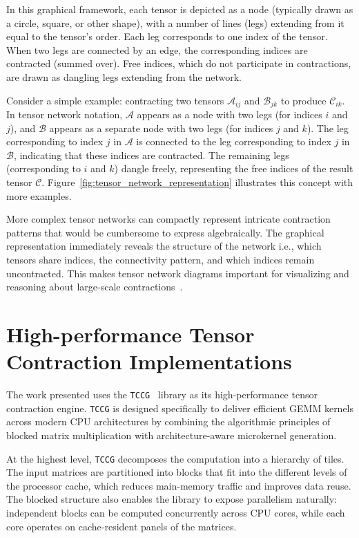 In this graphical framework, each tensor is depicted as a node (typically drawn as a circle, square, or other shape), with a number of lines (legs) extending from it equal to the tensor's order. Each leg corresponds to one index of the tensor. When two legs are connected by an edge, the corresponding indices are contracted (summed over). Free indices, which do not participate in contractions, are drawn as dangling legs extending from the network.

Consider a simple example: contracting two tensors $\mathcal{A}_{ij}$ and $\mathcal{B}_{jk}$ to produce $\mathcal{C}_{ik}$. In tensor network notation, $\mathcal{A}$ appears as a node with two legs (for indices $i$ and $j$), and $\mathcal{B}$ appears as a separate node with two legs (for indices $j$ and $k$). The leg corresponding to index $j$ in $\mathcal{A}$ is connected to the leg corresponding to index $j$ in $\mathcal{B}$, indicating that these indices are contracted. The remaining legs (corresponding to $i$ and $k$) dangle freely, representing the free indices of the result tensor $\mathcal{C}$. Figure~\ref{fig:tensor_network_representation} illustrates this concept with more examples.

More complex tensor networks can compactly represent intricate contraction patterns that would be cumbersome to express algebraically. The graphical representation immediately reveals the structure of the network i.e., which tensors share indices, the connectivity pattern, and which indices remain uncontracted. This makes tensor network diagrams important for visualizing and reasoning about large-scale contractions~\cite{biamonte2017tensor}. 

\section{High-performance Tensor Contraction Implementations}

The work presented uses the \texttt{\ac{TCCG}}~\cite{tccg2016a} library as its high-performance tensor contraction engine. \texttt{\ac{TCCG}} is designed specifically to deliver efficient \ac{GEMM} kernels across modern CPU architectures by combining the algorithmic principles of blocked matrix multiplication with architecture-aware microkernel generation.

At the highest level, \texttt{\ac{TCCG}} decomposes the computation into a hierarchy of tiles. The input matrices are partitioned into blocks that fit into the different levels of the processor cache, which reduces main-memory traffic and improves data reuse. The blocked structure also enables the library to expose parallelism naturally: independent blocks can be computed concurrently across CPU cores, while each core operates on cache-resident panels of the matrices.

